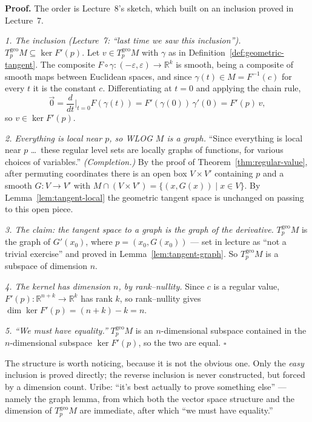 \documentclass[11pt]{report}
\renewenvironment{proof}[1][Proof]{\noindent\textbf{#1.} }{\hfill$\square$\par\vspace{5pt}}
\newcommand{\geo}{\mathrm{geo}}
\begin{document}
\begin{proof}
The order is Lecture~8's sketch, which built on an inclusion proved in Lecture~7.

\emph{1. The inclusion (Lecture~7: ``last time we saw this inclusion'').} $T^{\geo}_pM \subseteq \ker F'(p)$. Let $v \in T^{\geo}_pM$ with $\gamma$ as in Definition~\ref{def:geometric-tangent}. The composite $F \circ \gamma : (-\varepsilon,\varepsilon) \to \mathbb{R}^k$ is smooth, being a composite of smooth maps between Euclidean spaces, and since $\gamma(t) \in M = F^{-1}(c)$ for every $t$ it is the constant $c$. Differentiating at $t = 0$ and applying the chain rule,
\[
\vec 0 = \frac{d}{dt}\Big|_{t=0} F(\gamma(t)) = F'(\gamma(0))\,\gamma'(0) = F'(p)\, v ,
\]
so $v \in \ker F'(p)$.

\emph{2. Everything is local near $p$, so WLOG $M$ is a graph.} ``Since everything is local near $p$ \ldots\ these regular level sets are locally graphs of functions, for various choices of variables.'' \textit{(Completion.)} By the proof of Theorem~\ref{thm:regular-value}, after permuting coordinates there is an open box $V \times V'$ containing $p$ and a smooth $G : V \to V'$ with $M \cap (V \times V') = \{(x, G(x)) \mid x \in V\}$. By Lemma~\ref{lem:tangent-local} the geometric tangent space is unchanged on passing to this open piece.

\emph{3. The claim: the tangent space to a graph is the graph of the derivative.} $T^{\geo}_pM$ is the graph of $G'(x_0)$, where $p = (x_0, G(x_0))$ --- set in lecture as ``not a trivial exercise'' and proved in Lemma~\ref{lem:tangent-graph}. So $T^{\geo}_pM$ is a subspace of dimension $n$.

\emph{4. The kernel has dimension $n$, by rank--nullity.} Since $c$ is a regular value, $F'(p) : \mathbb{R}^{n+k} \to \mathbb{R}^k$ has rank $k$, so rank--nullity gives $\dim \ker F'(p) = (n+k) - k = n$.

\emph{5. ``We must have equality.''} $T^{\geo}_pM$ is an $n$-dimensional subspace contained in the $n$-dimensional subspace $\ker F'(p)$, so the two are equal.
\end{proof}

\begin{rembox}\label{rem:tangent-3}
The structure is worth noticing, because it is not the obvious one. Only the \emph{easy} inclusion is proved directly; the reverse inclusion is never constructed, but forced by a dimension count. Uribe: ``it's best actually to prove something else'' --- namely the graph lemma, from which both the vector space structure and the dimension of $T^{\geo}_pM$ are immediate, after which ``we must have equality.''
\end{rembox}
\end{document}
